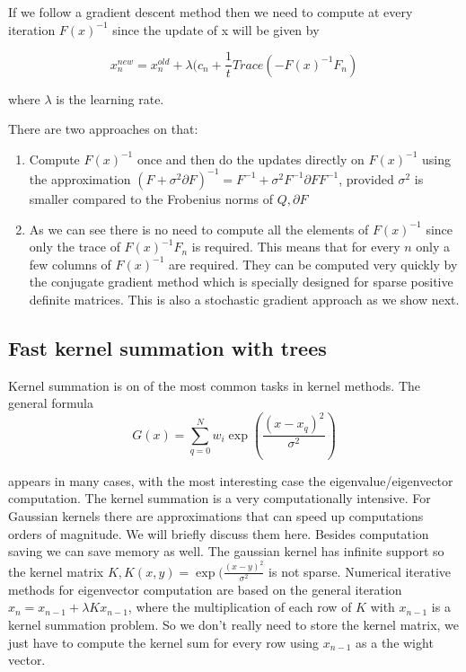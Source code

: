 \documentclass[12pt,letterpaper,doublespaced,ETD,dvips,proposal]{gtthesis}
\begin{document}
\begin{Body}
If we follow a gradient descent method then we need to compute at
every iteration $F(x)^{-1}$ since the update of x will be given by

\begin{equation}
x_{n}^{new}=x_{n}^{old}+\lambda (c_n
+\frac{1}{t}Trace(-F(x)^{-1}F_n)
\end{equation}

where $\lambda$ is the learning rate.

There are two approaches on that:
\begin{enumerate}
  \item Compute $F(x)^{-1}$ once and then do the updates directly on
  $F(x)^{-1}$ using the approximation $(F+ \sigma^2\partial F)^{-1}
  = F^{-1} + \sigma^2 F^{-1}\partial F F^{-1}$, provided $\sigma^2$
  is smaller compared to the Frobenius norms of $Q, \partial F$
  \item As we can see there is no need to compute all the elements
  of $F(x)^{-1}$ since only the trace of $F(x)^{-1}F_n$ is required.
  This means that for every $n$ only a few columns of $F(x)^{-1}$
  are required. They can be computed very quickly by the conjugate
  gradient method which is specially designed for sparse positive
  definite matrices. This is also a stochastic gradient approach as
  we show next.
\end{enumerate}

\subsection{Fast kernel summation with trees} Kernel summation is
on of the most common tasks in kernel methods. The general formula
\begin{equation}
\label{kernel_sum}
  G(x)=\sum_{q=0}^{N} w_i\exp(\frac{(x-x_q)^2}{\sigma^2})
\end{equation}

appears in many cases, with the most interesting case the
eigenvalue/eigenvector computation. The kernel summation is a very
computationally intensive. For Gaussian kernels there are
approximations that can speed up computations orders of magnitude.
We will briefly discuss them here. Besides computation saving we can
save memory as well. The gaussian kernel has infinite support so the
kernel matrix $K, K(x,y)=\exp(\frac{(x-y)^2}{\sigma^2}$ is not
sparse. Numerical iterative methods for eigenvector computation are
based on the general iteration $x_n=x_{n-1}+\lambda Kx_{n-1}$, where
the multiplication of each row of $K$ with $x_{n-1}$ is a kernel
summation problem. So we don't really need to store the kernel
matrix, we just have to compute the kernel sum for every row using
$x_{n-1}$ as a the wight vector.


\end{Body}
\end{document}
